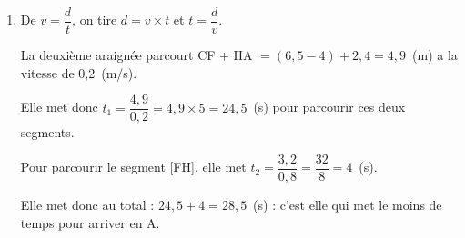 \begin{enumerate}[resume]
\item %

De $v = \dfrac{d}{t}$, on tire $d = v \times t$ et $t = \dfrac{d}{v}$.

La deuxième araignée parcourt CF + HA $= (6,5 - 4)  + 2,4 = 4,9$~(m) a la vitesse de 0,2~(m/s).

Elle met donc $t_1 = \dfrac{4,9}{0,2} = 4,9 \times 5 = 24,5$~(s) pour parcourir ces deux segments.

Pour parcourir le segment [FH], elle met $t_2 = \dfrac{3,2}{0,8} = \dfrac{32}{8} = 4$~(s).

Elle met donc au total : $24,5 + 4 = 28,5$~(s) : c'est elle qui met le moins de temps pour arriver en A.
\end{enumerate}

\bigskip

